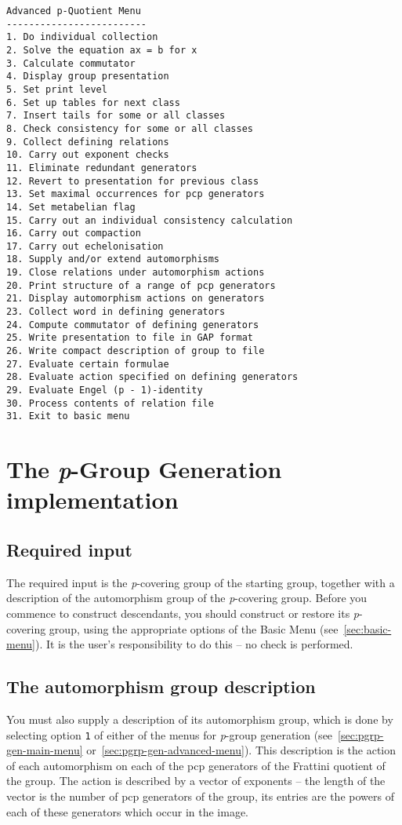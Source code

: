 \documentclass[12pt]{article}
\begin{document}
\begin{verbatim}
Advanced p-Quotient Menu
-------------------------
1. Do individual collection
2. Solve the equation ax = b for x
3. Calculate commutator
4. Display group presentation
5. Set print level
6. Set up tables for next class
7. Insert tails for some or all classes
8. Check consistency for some or all classes
9. Collect defining relations
10. Carry out exponent checks
11. Eliminate redundant generators
12. Revert to presentation for previous class
13. Set maximal occurrences for pcp generators
14. Set metabelian flag
15. Carry out an individual consistency calculation
16. Carry out compaction
17. Carry out echelonisation
18. Supply and/or extend automorphisms
19. Close relations under automorphism actions
20. Print structure of a range of pcp generators
21. Display automorphism actions on generators
23. Collect word in defining generators
24. Compute commutator of defining generators
25. Write presentation to file in GAP format
26. Write compact description of group to file
27. Evaluate certain formulae
28. Evaluate action specified on defining generators
29. Evaluate Engel (p - 1)-identity
30. Process contents of relation file
31. Exit to basic menu
\end{verbatim}

\section{The {\it p}-Group Generation implementation}
\subsection{Required input}
The required input is the {\it p}-covering group of the starting group,
together with a description of the automorphism group of the {\it p}-covering
group.
Before you commence to construct descendants,  
you should construct or restore its {\it p}-covering group,
using the appropriate options of the Basic Menu (see~\ref{sec:basic-menu}).
It is the user's responsibility to do this -- no check is performed.

\subsection{The automorphism group description}\label{sec:autgp-desc}
You must also supply a description of its automorphism group,
which is done by selecting option \texttt{1} of either 
of the menus for {\it p}-group generation
(see~\ref{sec:pgrp-gen-main-menu} or~\ref{sec:pgrp-gen-advanced-menu}).
This description is the action of each automorphism on each of the 
pcp generators of the Frattini quotient of the group.
The action is described by a vector of exponents -- the length
of the vector is the number of pcp generators of the group,
its entries are the powers of each of these generators 
which occur in the image.
\end{document}
